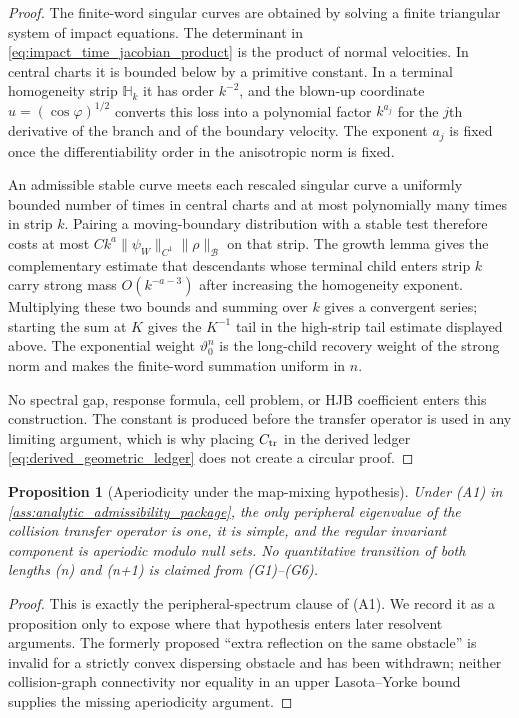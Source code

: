 \documentclass[12pt, letterpaper]{amsart}
\newcommand{\Bcal}{\mathcal{B}}
\theoremstyle{plain}
\newtheorem{proposition}[theorem]{Proposition}
\theoremstyle{definition}
\theoremstyle{remark}
\begin{document}
\begin{proof}
The finite-word singular curves are obtained by solving a finite triangular
system of impact equations.  The determinant in
\eqref{eq:impact_time_jacobian_product} is the product of normal velocities.  In
central charts it is bounded below by a primitive constant.  In a terminal
homogeneity strip $\mathbb H_k$ it has order $k^{-2}$, and the blown-up
coordinate $u=(\cos\varphi)^{1/2}$ converts this loss into a polynomial factor
$k^{a_j}$ for the $j$th derivative of the branch and of the boundary velocity.
The exponent $a_j$ is fixed once the differentiability order in the anisotropic
norm is fixed.

An admissible stable curve meets each rescaled singular curve a uniformly
bounded number of times in central charts and at most polynomially many times in
strip $k$.  Pairing a moving-boundary distribution with a stable test therefore
costs at most $Ck^{a}\|\psi_W\|_{C^1}\|\rho\|_{\Bcal}$ on that strip.  The growth
lemma gives the complementary estimate that descendants whose terminal child
enters strip $k$ carry strong mass $O(k^{-a-3})$ after increasing the
homogeneity exponent.  Multiplying these two bounds and summing over $k$ gives a
convergent series; starting the sum at $K$ gives the $K^{-1}$ tail in
the high-strip tail estimate displayed above.  The exponential weight $\vartheta_0^n$ is the
long-child recovery weight of the strong norm and makes the finite-word
summation uniform in $n$.

No spectral gap, response formula, cell problem, or HJB coefficient enters this
construction.  The constant is produced before the transfer operator is used in
any limiting argument, which is why placing $C_{\rm tr}$ in the derived ledger
\eqref{eq:derived_geometric_ledger} does not create a circular proof.
\end{proof}

\begin{proposition}[Aperiodicity under the map-mixing hypothesis]
\label{prop:primitive_hopf_chain_aperiodicity}
Under \textup{(A1)} in \cref{ass:analytic_admissibility_package}, the only
peripheral eigenvalue of the collision transfer operator is one, it is simple,
and the regular invariant component is aperiodic modulo null sets.  No
quantitative transition of both lengths (n) and (n+1) is claimed from
\textup{(G1)--(G6)}.
\end{proposition}

\begin{proof}
This is exactly the peripheral-spectrum clause of \textup{(A1)}.  We record it
as a proposition only to expose where that hypothesis enters later resolvent
arguments.  The formerly proposed ``extra reflection on the same obstacle'' is
invalid for a strictly convex dispersing obstacle and has been withdrawn;
neither collision-graph connectivity nor equality in an upper Lasota--Yorke
bound supplies the missing aperiodicity argument.
\end{proof}
\end{document}

